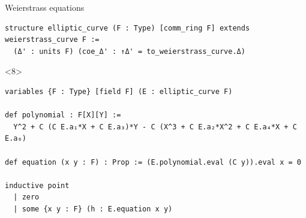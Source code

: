 \documentclass[10pt]{beamer}
\begin{document}
\begin{frame}[fragile, t]{Weierstrass equations}
\begin{onlyenv}
\begin{lstlisting}[backgroundcolor=\color{lime}, basicstyle=\scriptsize, frame=single]
structure elliptic_curve (F : Type) [comm_ring F] extends weierstrass_curve F :=
  (Δ' : units F) (coe_Δ' : ↑Δ' = to_weierstrass_curve.Δ)
\end{lstlisting}
\end{onlyenv}


\begin{onlyenv}<8>
\begin{lstlisting}[backgroundcolor=\color{lime}, basicstyle=\scriptsize, frame=single]
variables {F : Type} [field F] (E : elliptic_curve F)

def polynomial : F[X][Y] :=
  Y^2 + C (C E.a₁*X + C E.a₃)*Y - C (X^3 + C E.a₂*X^2 + C E.a₄*X + C E.a₆)

def equation (x y : F) : Prop := (E.polynomial.eval (C y)).eval x = 0

inductive point
  | zero
  | some {x y : F} (h : E.equation x y)
\end{lstlisting}
\end{onlyenv}

\end{frame}
\end{document}
